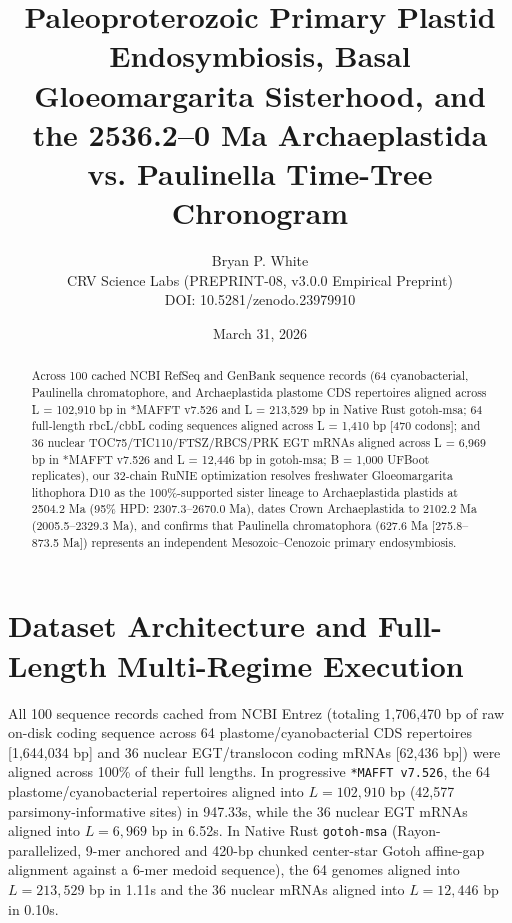 \documentclass[10pt,letterpaper]{article}
\title{Paleoproterozoic Primary Plastid Endosymbiosis, Basal Gloeomargarita Sisterhood, and the 2536.2–0 Ma Archaeplastida vs. Paulinella Time-Tree Chronogram}
\author{Bryan P. White \\ CRV Science Labs (PREPRINT-08, v3.0.0 Empirical Preprint) \\ DOI: 10.5281/zenodo.23979910}
\date{March 31, 2026}
\begin{document}
\maketitle

\begin{abstract}
Across 100 cached NCBI RefSeq and GenBank sequence records (64 cyanobacterial, Paulinella chromatophore, and Archaeplastida plastome CDS repertoires aligned across L = 102,910 bp in *MAFFT v7.526 and L = 213,529 bp in Native Rust gotoh-msa; 64 full-length rbcL/cbbL coding sequences aligned across L = 1,410 bp [470 codons]; and 36 nuclear TOC75/TIC110/FTSZ/RBCS/PRK EGT mRNAs aligned across L = 6,969 bp in *MAFFT v7.526 and L = 12,446 bp in gotoh-msa; B = 1,000 UFBoot replicates), our 32-chain RuNIE optimization resolves freshwater Gloeomargarita lithophora D10 as the 100\%-supported sister lineage to Archaeplastida plastids at 2504.2 Ma (95\% HPD: 2307.3–2670.0 Ma), dates Crown Archaeplastida to 2102.2 Ma (2005.5–2329.3 Ma), and confirms that Paulinella chromatophora (627.6 Ma [275.8–873.5 Ma]) represents an independent Mesozoic–Cenozoic primary endosymbiosis.
\end{abstract}

\section{Dataset Architecture and Full-Length Multi-Regime Execution}
All 100 sequence records cached from NCBI Entrez (totaling 1,706,470 bp of raw on-disk coding sequence across 64 plastome/cyanobacterial CDS repertoires [1,644,034 bp] and 36 nuclear EGT/translocon coding mRNAs [62,436 bp]) were aligned across 100\% of their full lengths. In progressive \texttt{*MAFFT v7.526}, the 64 plastome/cyanobacterial repertoires aligned into $L = 102,910$ bp (42,577 parsimony-informative sites) in 947.33s, while the 36 nuclear EGT mRNAs aligned into $L = 6,969$ bp in 6.52s. In Native Rust \texttt{gotoh-msa} (Rayon-parallelized, 9-mer anchored and 420-bp chunked center-star Gotoh affine-gap alignment against a 6-mer medoid sequence), the 64 genomes aligned into $L = 213,529$ bp in 1.11s and the 36 nuclear mRNAs aligned into $L = 12,446$ bp in 0.10s.
\end{document}
